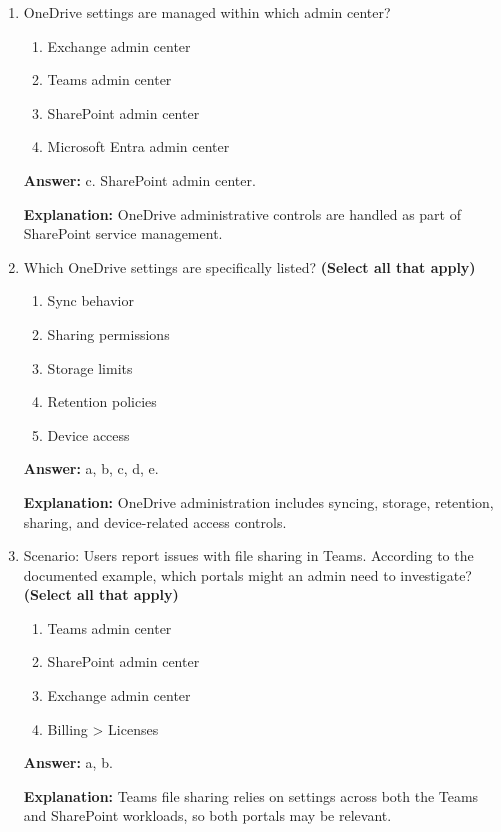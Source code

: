 \documentclass[10pt]{article}
\begin{document}
\begin{enumerate}[leftmargin=*]
\textbf{Explanation:} SharePoint administration centers on content sites, storage, sharing governance, and usage visibility.

\item OneDrive settings are managed within which admin center?
\begin{enumerate}[label=\alph*., leftmargin=1.5em]
\item Exchange admin center
\item Teams admin center
\item SharePoint admin center
\item Microsoft Entra admin center
\end{enumerate}
\textbf{Answer:} c. SharePoint admin center.

\textbf{Explanation:} OneDrive administrative controls are handled as part of SharePoint service management.

\item Which OneDrive settings are specifically listed? \textbf{(Select all that apply)}
\begin{enumerate}[label=\alph*., leftmargin=1.5em]
\item Sync behavior
\item Sharing permissions
\item Storage limits
\item Retention policies
\item Device access
\end{enumerate}
\textbf{Answer:} a, b, c, d, e.

\textbf{Explanation:} OneDrive administration includes syncing, storage, retention, sharing, and device-related access controls.

\item Scenario: Users report issues with file sharing in Teams. According to the documented example, which portals might an admin need to investigate? \textbf{(Select all that apply)}
\begin{enumerate}[label=\alph*., leftmargin=1.5em]
\item Teams admin center
\item SharePoint admin center
\item Exchange admin center
\item Billing > Licenses
\end{enumerate}
\textbf{Answer:} a, b.

\textbf{Explanation:} Teams file sharing relies on settings across both the Teams and SharePoint workloads, so both portals may be relevant.


\end{enumerate}
\end{document}
